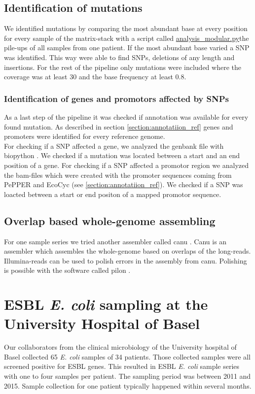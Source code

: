 \subsection{Identification of mutations} 
We identified mutations by comparing the most abundant base at every position for every sample of the matrix-stack with a script called \href{https://github.com/nahanoo/ESBL\_project/pileup.py}{analysis\_modular.py}the pile-ups of all samples from one patient. If the most abundant base varied a SNP was identified. This way were able to find SNPs, deletions of any length and insertions.
For the rest of the pipeline only mutations were included where the coverage was at least 30 and the base frequency at least 0.8.

\subsubsection{Identification of genes and promotors affected by SNPs}
As a last step of the pipeline it was checked if annotation was available for every found mutation. As described in section \ref{section:annotatiion_ref} genes and promoters were identified for every reference genome. \\
For checking if a SNP affected a gene, we analyzed the genbank file with biopython \cite{cock_biopython:_2009}. We checked if a mutation was located between a start and an end position of a gene. For checking if a SNP affected a promotor region we analyzed the bam-files which were created with the promoter sequences coming from PePPER and EcoCyc (see \ref{section:annotatiion_ref}). We checked if a SNP was loacted between a start or end positon of a mapped promotor sequence. 

\subsection{Overlap based whole-genome assembling}
For one sample series we tried another assembler called canu \cite{koren_canu:_2017}. Canu is an assembler which assembles the whole-genome based on overlaps of the long-reads. Illumina-reads can be used to polish errors in the assembly from canu. Polishing is possible with the software called pilon \cite{noauthor_pilon:_nodate}.


\section{ESBL \textit{E. coli} sampling at the University Hospital of Basel}
Our collaborators from the clinical microbiology of the University hospital of Basel collected 65 \textit{E. coli} samples of 34 patients. Those collected samples were all screened positive for ESBL genes. This resulted in ESBL \textit{E. coli} sample series with one to four samples per patient. The sampling period was between 2011 and 2015. Sample collection for one patient typically happened within several months.
